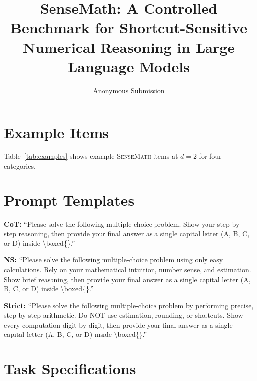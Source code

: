 \documentclass{article}
\title{SenseMath: A Controlled Benchmark for Shortcut-Sensitive Numerical Reasoning in Large Language Models}
\author{
  Anonymous Submission
}
\begin{document}
\ifcolmsubmission
\linenumbers
\fi

\maketitle

\begin{abstract}

\end{abstract}










\appendix

\section{Example Items}
\label{sec:appendix_examples}

Table~\ref{tab:examples} shows example \textsc{SenseMath} items at $d{=}2$ for four categories.



\section{Prompt Templates}
\label{sec:appendix_prompts}

\textbf{CoT:} ``Please solve the following multiple-choice problem. Show your step-by-step reasoning, then provide your final answer as a single capital letter (A, B, C, or D) inside \textbackslash boxed\{\}.''

\textbf{NS:} ``Please solve the following multiple-choice problem using only easy calculations. Rely on your mathematical intuition, number sense, and estimation. Show brief reasoning, then provide your final answer as a single capital letter (A, B, C, or D) inside \textbackslash boxed\{\}.''

\textbf{Strict:} ``Please solve the following multiple-choice problem by performing precise, step-by-step arithmetic. Do NOT use estimation, rounding, or shortcuts. Show every computation digit by digit, then provide your final answer as a single capital letter (A, B, C, or D) inside \textbackslash boxed\{\}.''

\section{Task Specifications}
\label{sec:appendix_tasks}
\end{document}
